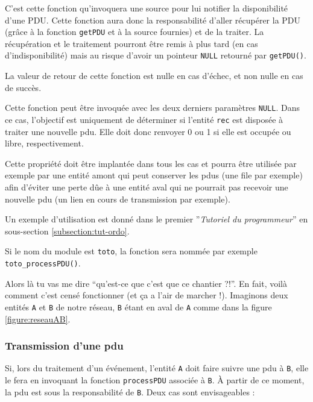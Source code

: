    C'est cette fonction qu'invoquera une source pour lui notifier la
disponibilité d'une PDU. Cette fonction aura donc la responsabilité
d'aller récupérer la PDU (grâce à la fonction \lstinline!getPDU! et à la source
fournies) et de la traiter. La récupération et le traitement pourront
être remis à plus tard (en cas d'indisponibilité) mais au risque
d'avoir un pointeur \lstinline!NULL! retourné par
\lstinline!getPDU()!.

   La valeur de retour de cette fonction est nulle en cas d'échec, et
non nulle en cas de succès.

   Cette fonction peut être invoquée avec les deux derniers paramètres
{\tt NULL}. Dans ce cas, l'objectif est uniquement de déterminer si
l'entité {\tt rec} est disposée à traiter une nouvelle {\sc pdu}. Elle
doit donc renvoyer 0 ou 1 si elle est occupée ou libre,
respectivement. 

   Cette propriété doit être implantée dans tous les cas et pourra
être utilisée par exemple par une entité amont qui peut conserver les
{\sc pdu}s (une file par exemple) afin d'éviter une perte dûe à une
entité aval qui ne pourrait pas recevoir une nouvelle {\sc pdu} (un
lien en cours de  transmission par exemple).

   Un exemple d'utilisation est donné dans le premier ''{\em Tutoriel
     du programmeur}'' en sous-section \ref{subsection:tut-ordo}.

   Si le nom du module est {\tt toto}, la fonction sera nommée par exemple
{\tt toto\_processPDU()}.

   Alors là tu vas me dire ``qu'est-ce que c'est que ce chantier
?!''. En fait, voilà comment c'est censé fonctionner (et ça a l'air
de marcher !). Imaginons deux entités {\tt A} et {\tt B} de notre
réseau, {\tt B} étant en aval de {\tt A} comme dans la figure
\ref{figure:reseauAB}.

%
\subsubsection{Transmission d'une {\sc pdu}}

   Si, lors du traitement d'un événement, l'entité {\tt A} doit faire
suivre une {\sc pdu} à {\tt B}, elle le fera en invoquant la fonction
\lstinline!processPDU! associée à {\tt B}. À partir de ce moment, la
{\sc pdu} est sous la responsabilité de {\tt B}. Deux cas sont
envisageables : 

